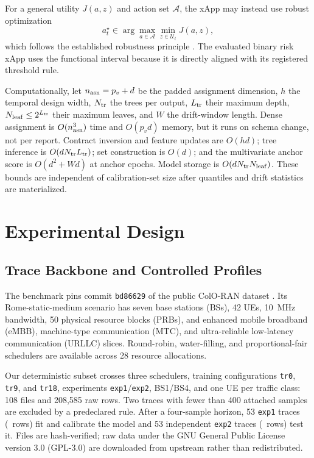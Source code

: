 \documentclass[10pt,journal,twoside]{IEEEtran}
\newcommand{\cU}{\mathcal{U}}
\newcommand{\cA}{\mathcal{A}}
\begin{document}
For a general utility $J(a,z)$ and action set $\cA$, the xApp may instead use robust optimization
\begin{equation}
a_t^\star\in\arg\max_{a\in\cA}\min_{z\in\cU_t}J(a,z),
\label{eq:robust-action}
\end{equation}
which follows the established robustness principle \cite{bertsimas2004robustness}. The evaluated binary risk xApp uses the functional interval because it is directly aligned with its registered threshold rule.

Computationally, let $n_{\rm asn}=p_v+d$ be the padded assignment dimension, $h$ the temporal design width, $N_{\rm tr}$ the trees per output, $L_{\rm tr}$ their maximum depth, $N_{\rm leaf}\le2^{L_{\rm tr}}$ their maximum leaves, and $W$ the drift-window length. Dense assignment is $O(n_{\rm asn}^3)$ time and $O(p_vd)$ memory, but it runs on schema change, not per report. Contract inversion and feature updates are $O(hd)$; tree inference is $O(dN_{\rm tr}L_{\rm tr})$; set construction is $O(d)$; and the multivariate anchor score is $O(d^2+Wd)$ at anchor epochs. Model storage is $O(dN_{\rm tr}N_{\rm leaf})$. These bounds are independent of calibration-set size after quantiles and drift statistics are materialized.

\section{Experimental Design}
\subsection{Trace Backbone and Controlled Profiles}
The benchmark pins commit \texttt{bd86629} of the public ColO-RAN dataset \cite{polese2023coloran}. Its Rome-static-medium scenario has seven base stations (BSs), 42 UEs, 10~MHz bandwidth, 50 physical resource blocks (PRBs), and enhanced mobile broadband (eMBB), machine-type communication (MTC), and ultra-reliable low-latency communication (URLLC) slices. Round-robin, water-filling, and proportional-fair schedulers are available across 28 resource allocations.

Our deterministic subset crosses three schedulers, training configurations \texttt{tr0}, \texttt{tr9}, and \texttt{tr18}, experiments \texttt{exp1}/\texttt{exp2}, BS1/BS4, and one UE per traffic class: 108 files and 208,585 raw rows. Two traces with fewer than 400 attached samples are excluded by a predeclared rule. After a four-sample horizon, 53 \texttt{exp1} traces (\TrainingRows\ rows) fit and calibrate the model and 53 independent \texttt{exp2} traces (\TestRows\ rows) test it. Files are hash-verified; raw data under the GNU General Public License version 3.0 (GPL-3.0) are downloaded from upstream rather than redistributed.
\end{document}

